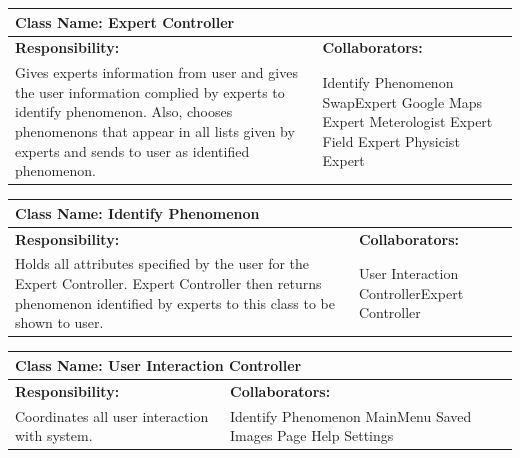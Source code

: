 \documentclass[]{article}
\begin{document}
	\begin{table}[!hb]
		\centering
		\begin{tabular}{|p{5cm}|p{5cm}|}
		\hline 
		 \multicolumn{2}{|l|}{\textbf{Class Name: Expert Controller}} \\
		\hline
		\textbf{Responsibility:} & \textbf{Collaborators:} \\
		\hline
		Gives experts information from user and gives the user information complied by experts to identify phenomenon. Also, chooses phenomenons that appear in all lists given by experts and sends to user as identified phenomenon.  & Identify Phenomenon \newline SwapExpert \newline Google Maps Expert \newline Meterologist Expert \newline Field Expert \newline Physicist Expert\\
		\hline
		\end{tabular}
	\end{table}
	
	\begin{table}[!hb]
		\centering
		\begin{tabular}{|p{5cm}|p{5cm}|}
		\hline 
		 \multicolumn{2}{|l|}{\textbf{Class Name: Identify Phenomenon}} \\
		\hline
		\textbf{Responsibility:} & \textbf{Collaborators:} \\
		\hline
		Holds all attributes specified by the user for the Expert Controller. Expert Controller then returns phenomenon identified by experts to this class to be shown to user.  & User Interaction Controller\newline Expert Controller\\
		\hline
		\end{tabular}
	\end{table}
	
\pagebreak
	\begin{table}[!hb]
		\centering
		\begin{tabular}{|p{5cm}|p{5cm}|}
		\hline 
		 \multicolumn{2}{|l|}{\textbf{Class Name: User Interaction Controller}} \\
		\hline
		\textbf{Responsibility:} & \textbf{Collaborators:} \\
		\hline
		 Coordinates all user interaction with system. & Identify Phenomenon \newline MainMenu \newline Saved Images Page \newline Help \newline Settings \\
		\hline
		\end{tabular}
	\end{table}
\end{document}
